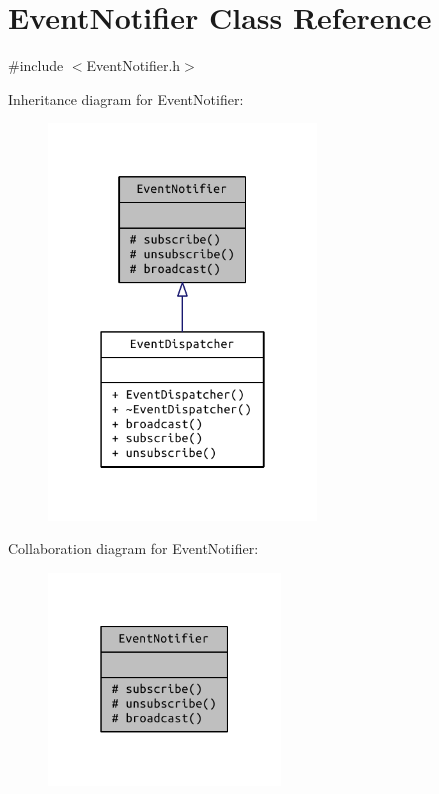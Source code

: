 \hypertarget{class_event_notifier}{}\section{Event\+Notifier Class Reference}
\label{class_event_notifier}


{\ttfamily \#include $<$Event\+Notifier.\+h$>$}



Inheritance diagram for Event\+Notifier\+:
\nopagebreak
\begin{figure}[H]
\begin{center}
\leavevmode
\includegraphics[width=202pt]{class_event_notifier__inherit__graph}
\end{center}
\end{figure}


Collaboration diagram for Event\+Notifier\+:
\nopagebreak
\begin{figure}[H]
\begin{center}
\leavevmode
\includegraphics[width=175pt]{class_event_notifier__coll__graph}
\end{center}
\end{figure}
